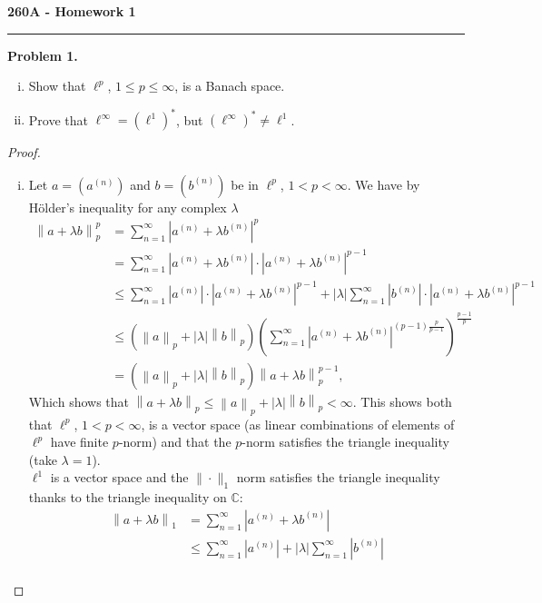 \documentclass[11pt,letterpaper]{report}
\newcommand{\complex}{\mathbb{C}}
\newcommand{\pnorm}[2]{\left\|{#1}\right\|_{{#2}}}
\begin{document}
\begin{center}
{\bf \Large 260A - Homework 1} %
\vspace{0.2cm}
\hrule
\end{center}

\noindent\textbf{Problem 1. }
\begin{enumerate}[(i)]
	\item Show that $\ell^p$, $1\leq p\leq \infty$, is a Banach space.
	\item Prove that $\ell^\infty = (\ell^1)^*$, but $(\ell^\infty)^*\neq \ell^1$.
\end{enumerate}
\begin{proof}
	\begin{enumerate}[(i)]
		\item Let $a = (a^{(n)})$ and $b = (b^{(n)})$ be in $\ell^p$, $1<p<\infty$. We have by H\"older's inequality for any complex $\lambda$
		\begin{align*}
			\pnorm{a+\lambda b}{p}^p &= \sum_{n=1}^\infty|a^{(n)}+\lambda b^{(n)}|^p\\
			&= \sum_{n=1}^\infty|a^{(n)}+\lambda b^{(n)}|\cdot |a^{(n)} + \lambda b^{(n)}|^{p-1}\\
			&\leq \sum_{n=1}^\infty |a^{(n)}|\cdot |a^{(n)}+\lambda b^{(n)}|^{p-1} + |\lambda|\sum_{n=1}^\infty|b^{(n)}|\cdot |a^{(n)}+\lambda b^{(n)}|^{p-1}\\
			&\leq (\pnorm{a}{p} + |\lambda|\pnorm{b}{p})\left(\sum_{n=1}^\infty |a^{(n)}+\lambda b^{(n)}|^{(p-1)\frac{p}{p-1}}\right)^{\frac{p-1}{p}}\\
			&= (\pnorm{a}{p} + |\lambda|\pnorm{b}{p})\pnorm{a+\lambda b}{p}^{p-1},
		\end{align*}
		Which shows that $\pnorm{a+\lambda b}{p}\leq \pnorm{a}{p}+|\lambda|\pnorm{b}{p}<\infty$. This shows both that $\ell^p$, $1<p<\infty$, is a vector space (as linear combinations of elements of $\ell^p$ have finite $p$-norm) and that the $p$-norm satisfies the triangle inequality (take $\lambda = 1$).\\
		$\ell^1$ is a vector space and the $\|\cdot \|_1$ norm satisfies the triangle inequality thanks to the triangle inequality on $\complex$:
		\begin{align*}
			\pnorm{a+\lambda b}{1} &= \sum_{n=1}^\infty |a^{(n)}+\lambda b^{(n)}|\\
			&\leq \sum_{n=1}^\infty|a^{(n)}| + |\lambda|\sum_{n=1}^\infty |b^{(n)}|\\

\end{align*}
\end{enumerate}
\end{proof}
\end{document}
